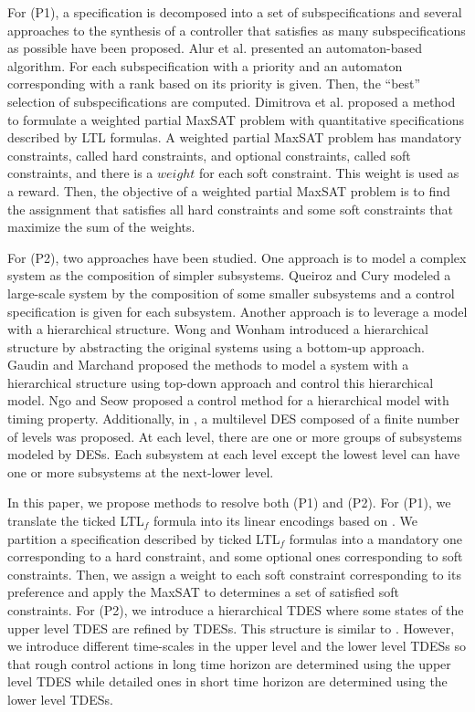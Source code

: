 \documentclass[journal,twoside,web]{IEEEtran}
\begin{document}
%
For (P1), a specification is decomposed into a set of subspecifications and several approaches to the synthesis of a controller that satisfies as many subspecifications as possible have been proposed. 
Alur et al.\cite{AKW2008} presented an automaton-based algorithm.
For each subspecification with a priority and an automaton corresponding with a rank based on its priority is given. 
%
Then, the ``best'' selection of subspecifications are computed.
%
Dimitrova et al.\cite{DGT2018} proposed a method to formulate a weighted partial MaxSAT problem with quantitative specifications described by LTL formulas.
A weighted partial MaxSAT problem has mandatory constraints, called hard constraints, and optional constraints, called soft constraints, and there is a $weight$ for each soft constraint. 
This weight is used as a reward.
Then, the objective of a weighted partial MaxSAT problem is to find the assignment that satisfies all hard constraints and some soft constraints that maximize the sum of the weights.

%
For (P2), two approaches have been studied.
One approach is to model a complex system as the composition of simpler subsystems.
Queiroz and Cury\cite{QC2000} modeled a large-scale system by the composition of some smaller subsystems and a control specification is given for each subsystem.
%
Another approach is to leverage a model with a hierarchical structure.
%
Wong and Wonham\cite{WW1996a,WW1996b} introduced a hierarchical structure by abstracting the original systems using a bottom-up approach.
Gaudin and Marchand\cite{GAUDIN2004131} proposed the methods to model a system with a hierarchical structure using top-down approach and control this hierarchical model.
%
Ngo and Seow\cite{Ngo2018} proposed a control method for a hierarchical model with timing property.
%
Additionally, in \cite{8759973,7497833}, a multilevel DES composed of a finite number of levels was proposed. At each level, there are one or more groups of subsystems modeled by DESs. 
Each subsystem at each level except the lowest level can have one or more subsystems at the next-lower level.

%
%
In this paper, we propose methods to resolve both (P1) and (P2).
For (P1), we translate the ticked LTL$_f$ formula into its linear encodings based on \cite{DGT2018}. We partition a specification described by ticked LTL$_f$ formulas into a mandatory one corresponding to a hard constraint, and some optional ones corresponding to soft constraints.
%
Then, we assign a weight to each soft constraint corresponding to its preference and apply the MaxSAT to determines a set of satisfied soft constraints. 
For (P2), we introduce a hierarchical TDES where some states of the upper level TDES are refined by TDESs.
%
This structure is similar to \cite{GAUDIN2004131,8759973}.
However, we introduce different time-scales in the upper level and the lower level TDESs so that rough control actions in long time horizon are determined using the upper level TDES while detailed ones in short time horizon are determined using the lower level TDESs. 
\end{document}
